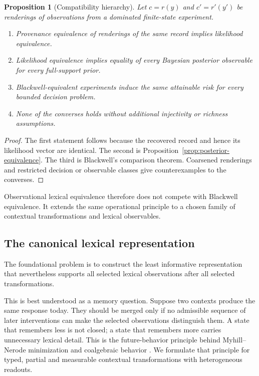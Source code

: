\documentclass[11pt]{article}
\newtheorem{proposition}[definition]{Proposition}
\begin{document}
\begin{proposition}[Compatibility hierarchy]\label{prop:hierarchy}
Let $c=r(y)$ and $c'=r'(y')$ be renderings of observations from a dominated finite-state experiment.
\begin{enumerate}
\item Provenance equivalence of renderings of the same record implies likelihood equivalence.
\item Likelihood equivalence implies equality of every Bayesian posterior observable for every full-support prior.
\item Blackwell-equivalent experiments induce the same attainable risk for every bounded decision problem.
\item None of the converses holds without additional injectivity or richness assumptions.
\end{enumerate}
\end{proposition}
\begin{proof}
The first statement follows because the recovered record and hence its likelihood vector are identical. The second is Proposition~\ref{prop:posterior-equivalence}. The third is Blackwell's comparison theorem. Coarsened renderings and restricted decision or observable classes give counterexamples to the converses.
\end{proof}

Observational lexical equivalence therefore does not compete with Blackwell equivalence. It extends the same operational principle to a chosen family of contextual transformations and lexical observables.

\subsection{The canonical lexical representation}

The foundational problem is to construct the least informative representation that nevertheless supports all selected lexical observations after all selected transformations.

This is best understood as a memory question.  Suppose two contexts produce
the same response today.  They should be merged only if no admissible sequence
of later interventions can make the selected observations distinguish them.
A state that remembers less is not closed; a state that remembers more carries
unnecessary lexical detail.  This is the future-behavior principle behind
Myhill--Nerode minimization and coalgebraic behavior
\cite{nerode1958,rutten2000}.  We formulate that principle for typed, partial
and measurable contextual transformations with heterogeneous readouts.
\end{document}
